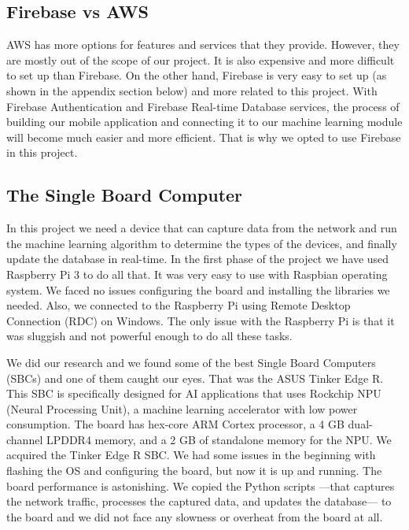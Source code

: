 \documentclass{article}
\begin{document}
\subsection{Firebase vs AWS}
AWS has more options for features and services that they provide. However, they are mostly out of the scope of our project. It is also expensive and more difficult to set up than Firebase. On the other hand, Firebase is very easy to set up (as shown in the appendix section below) and more related to this project. With Firebase Authentication and  Firebase Real-time Database services, the process of building our mobile application and connecting it to our machine learning module will become much easier and more efficient. That is why we opted to use Firebase in this project.

\subsection{The Single Board Computer}
In this project we need a device that can capture data from the network and run the machine learning algorithm to determine the types of the devices, and finally update the database in real-time. In the first phase of the project we have used Raspberry Pi 3 to do all that. It was very easy to use with Raspbian operating system. We faced no issues configuring the board and installing the libraries we needed. Also, we connected to the Raspberry Pi using Remote Desktop Connection (RDC) on Windows. The only issue with the Raspberry Pi is that it was sluggish and not powerful enough to do all these tasks. \newline

We did our research and we found some of the best Single Board Computers (SBCs) and one of them caught our eyes. That was the ASUS Tinker Edge R. This SBC is specifically designed for AI applications that uses Rockchip NPU (Neural Processing Unit), a machine learning accelerator with low power consumption. The board has hex-core ARM Cortex processor, a 4 GB dual-channel LPDDR4 memory, and a 2 GB of standalone memory for the NPU. We acquired the Tinker Edge R SBC. We had some issues in the beginning with flashing the OS and configuring the board, but now it is up and running. The board performance is astonishing. We copied the Python scripts —that captures the network traffic, processes the captured data, and updates the database— to the board and we did not face any slowness or overheat from the board at all. \newline
\end{document}
